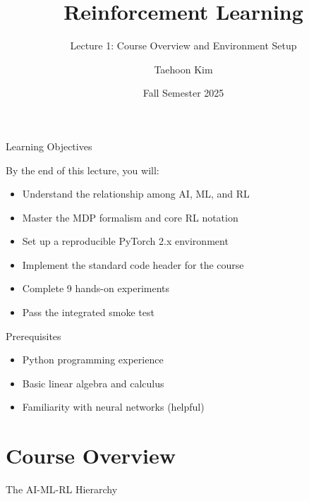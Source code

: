 \documentclass[aspectratio=169,10pt]{beamer}
\title{Reinforcement Learning}
\subtitle{Lecture 1: Course Overview and Environment Setup}
\author{Taehoon Kim}
\institute{Sogang University MIMIC Lab \\ \url{https://mimic-lab.com}}
\date{Fall Semester 2025}
\begin{document}
\frame{\titlepage}

\begin{frame}{Learning Objectives}
\begin{block}{By the end of this lecture, you will:}
\begin{itemize}
    \item Understand the relationship among AI, ML, and RL
    \item Master the MDP formalism and core RL notation
    \item Set up a reproducible PyTorch 2.x environment
    \item Implement the standard code header for the course
    \item Complete 9 hands-on experiments
    \item Pass the integrated smoke test
\end{itemize}
\end{block}

\begin{alertblock}{Prerequisites}
\begin{itemize}
    \item Python programming experience
    \item Basic linear algebra and calculus
    \item Familiarity with neural networks (helpful)
\end{itemize}
\end{alertblock}
\end{frame}

\section{Course Overview}

\begin{frame}{The AI-ML-RL Hierarchy}
\begin{center}
\end{center}
\end{frame}
\end{document}
